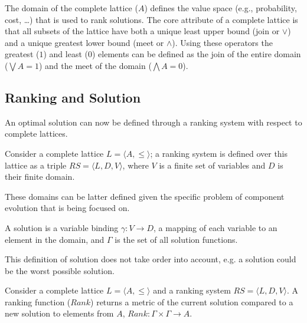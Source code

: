 The domain of the complete lattice ($A$) defines the value space (e.g., probability, cost, \ldots) 
that is used to rank solutions. 
The core attribute of a complete lattice is that all subsets of the lattice have both a unique least upper bound (join or $\vee$) 
and a unique greatest lower bound (meet or $\wedge$).
Using these operators the greatest ($1$) and least ($0$) elements can be defined as
the join of the entire domain ($\bigvee A = 1$) and the meet of the domain ($\bigwedge A = 0$).

\subsection{Ranking and Solution}
An optimal solution can now be defined through a ranking system with respect to complete lattices.

\begin{defs}
Consider a complete lattice $L = \langle A, \leq \rangle$; 
a ranking system is defined over this lattice as a triple $RS = \langle L, D, V \rangle$, 
where $V$ is a finite set of variables and $D$ is their finite domain.
\end{defs}

These domains can be latter defined given the specific problem of component evolution that is being focused on.

\begin{defs}
A solution is a variable binding $\gamma: V \rightarrow D$, a mapping of each variable to an element in the domain,
and $\Gamma$ is the set of all solution functions.
\end{defs}

This definition of solution does not take order into account, e.g. a solution could be the worst possible solution.

\begin{defs}
Consider a complete lattice $L = \langle A, \leq \rangle$ and a ranking system $RS = \langle L, D, V \rangle$.
A ranking function ($Rank$) returns a metric of the current solution compared to a new solution to elements from $A$,
$Rank: \Gamma \times \Gamma \rightarrow A$.
\end{defs}


